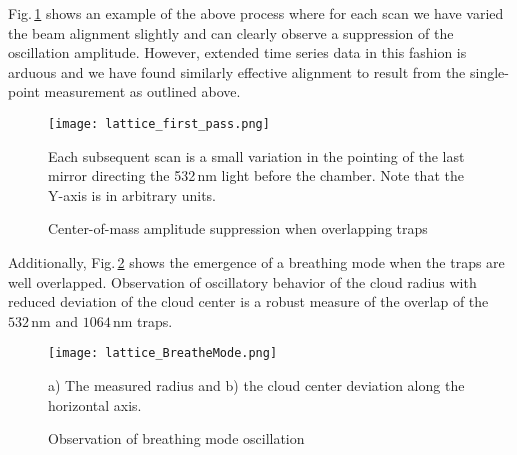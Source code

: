 Fig.\,\ref{fig:latFirtPass} shows an example of the above process where for each scan we have varied the beam alignment slightly and can clearly observe a suppression of the oscillation amplitude.
However, extended time series data in this fashion is arduous and we have found similarly effective alignment to result from the single-point measurement as outlined above.
	\begin{figure} 
		\centerline{
		\texttt{[image: lattice\_first\_pass.png]}}
		\caption{Center-of-mass amplitude suppression when overlapping traps}{Each subsequent scan is a small variation in the pointing of the last mirror directing the 532\,nm light before the chamber. Note that the Y-axis is in arbitrary units.}
		\label{fig:latFirtPass}
	\end{figure}
	
Additionally, Fig.\,\ref{fig:latBreatheMode} shows the emergence of a breathing mode when the traps are well overlapped.
Observation of oscillatory behavior of the cloud radius with reduced deviation of the cloud center is a robust measure of the overlap of the $532$\,nm and $1064$\,nm traps.
	\begin{figure} 
		\centerline{
		\texttt{[image: lattice\_BreatheMode.png]}}
		\caption{Observation of breathing mode oscillation}{a) The measured radius and b) the cloud center deviation along the horizontal axis.}
		\label{fig:latBreatheMode}
	\end{figure}
	


